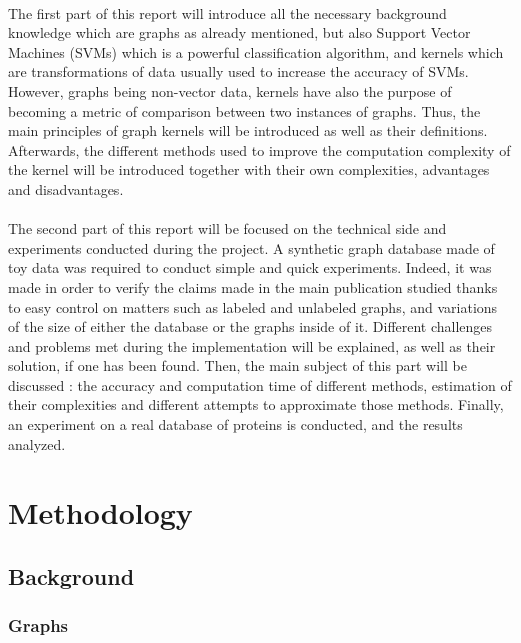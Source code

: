 \documentclass{article}
\theoremstyle{definition}
\begin{document}
 \paragraph{}The first part of this report will introduce all the necessary background knowledge which are graphs as already mentioned, but also Support Vector Machines (SVMs) which is a powerful classification algorithm, and kernels which are transformations of data usually used to increase the accuracy of SVMs. However, graphs being non-vector data, kernels have also the purpose of becoming a metric of comparison between two instances of graphs. Thus, the main principles of graph kernels will be introduced as well as their definitions. Afterwards, the different methods used to improve the computation complexity of the kernel will be introduced together with their own complexities, advantages and disadvantages.

\paragraph{}The second part of this report will be focused on the technical side and experiments conducted during the project. A synthetic graph database made of toy data was required to conduct simple and quick experiments. Indeed, it was made in order to verify the claims made in the main publication studied thanks to easy control on matters such as labeled and unlabeled graphs, and variations of the size of either the database or the graphs inside of it. Different challenges and problems met during the implementation will be explained, as well as their solution, if one has been found. Then, the main subject of this part will be discussed : the accuracy and computation time of different methods, estimation of their complexities and different attempts to approximate those methods. Finally, an experiment on a real database of proteins is conducted, and the results analyzed.
 
\section{Methodology}
\subsection{Background}
\subsubsection{Graphs}
\end{document}
